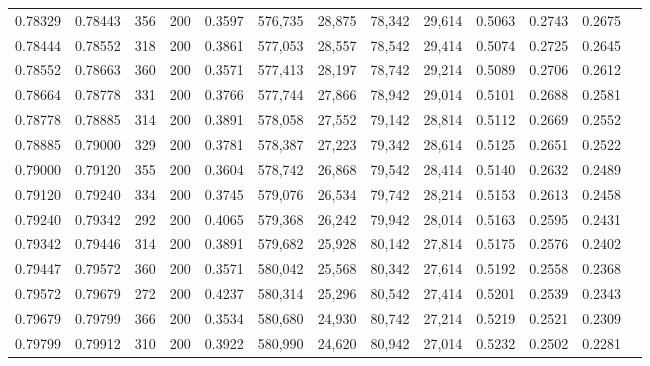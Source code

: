\begin{tabular}{rrrrrrrrrrrrr}
0.78329 & 0.78443 &    356 & 200 &                                     0.3597 & 576,735 &  28,875 &  78,342 &  29,614 & 0.5063 & 0.2743 & 0.2675 \\
0.78444 & 0.78552 &    318 & 200 &                                     0.3861 & 577,053 &  28,557 &  78,542 &  29,414 & 0.5074 & 0.2725 & 0.2645 \\
0.78552 & 0.78663 &    360 & 200 &                                     0.3571 & 577,413 &  28,197 &  78,742 &  29,214 & 0.5089 & 0.2706 & 0.2612 \\
0.78664 & 0.78778 &    331 & 200 &                                     0.3766 & 577,744 &  27,866 &  78,942 &  29,014 & 0.5101 & 0.2688 & 0.2581 \\
0.78778 & 0.78885 &    314 & 200 &                                     0.3891 & 578,058 &  27,552 &  79,142 &  28,814 & 0.5112 & 0.2669 & 0.2552 \\
0.78885 & 0.79000 &    329 & 200 &                                     0.3781 & 578,387 &  27,223 &  79,342 &  28,614 & 0.5125 & 0.2651 & 0.2522 \\
0.79000 & 0.79120 &    355 & 200 &                                     0.3604 & 578,742 &  26,868 &  79,542 &  28,414 & 0.5140 & 0.2632 & 0.2489 \\
0.79120 & 0.79240 &    334 & 200 &                                     0.3745 & 579,076 &  26,534 &  79,742 &  28,214 & 0.5153 & 0.2613 & 0.2458 \\
0.79240 & 0.79342 &    292 & 200 &                                     0.4065 & 579,368 &  26,242 &  79,942 &  28,014 & 0.5163 & 0.2595 & 0.2431 \\
0.79342 & 0.79446 &    314 & 200 &                                     0.3891 & 579,682 &  25,928 &  80,142 &  27,814 & 0.5175 & 0.2576 & 0.2402 \\
0.79447 & 0.79572 &    360 & 200 &                                     0.3571 & 580,042 &  25,568 &  80,342 &  27,614 & 0.5192 & 0.2558 & 0.2368 \\
0.79572 & 0.79679 &    272 & 200 &                                     0.4237 & 580,314 &  25,296 &  80,542 &  27,414 & 0.5201 & 0.2539 & 0.2343 \\
0.79679 & 0.79799 &    366 & 200 &                                     0.3534 & 580,680 &  24,930 &  80,742 &  27,214 & 0.5219 & 0.2521 & 0.2309 \\
0.79799 & 0.79912 &    310 & 200 &                                     0.3922 & 580,990 &  24,620 &  80,942 &  27,014 & 0.5232 & 0.2502 & 0.2281 \\

\end{tabular}

